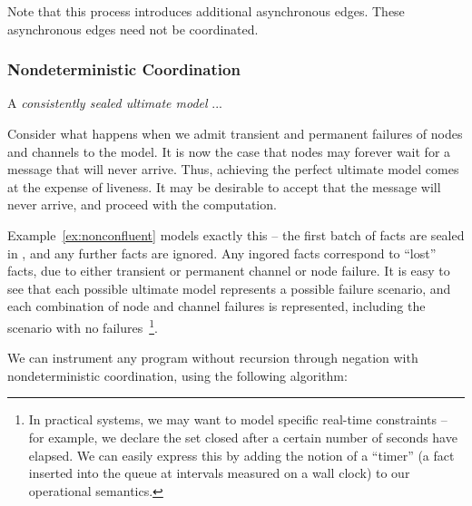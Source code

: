 Note that this process introduces additional asynchronous edges.  These asynchronous edges need not be coordinated. 


\subsubsection{Nondeterministic Coordination}

\begin{definition}
A {\em consistently sealed ultimate model} ...
\end{definition}


Consider what happens when we admit transient and permanent failures of nodes and channels to the model.  It is now the case that nodes may forever wait for a message that will never arrive.  Thus, achieving the perfect ultimate model comes at the expense of liveness.  It may be desirable to accept that the message will never arrive, and proceed with the computation.

Example~\ref{ex:nonconfluent} models exactly this -- the first batch of  facts are sealed in , and any further  facts are ignored.  Any ingored  facts correspond to ``lost''  facts, due to either transient or permanent channel or node failure.  It is easy to see that each possible ultimate model represents a possible failure scenario, and each combination of node and channel failures is represented, including the scenario with no failures~\footnote{In practical systems, we may want to model specific real-time constraints -- for example, we declare the set closed after a certain number of seconds have elapsed.  We can easily express this by adding the notion of a ``timer'' (a fact inserted into the queue at intervals measured on a wall clock) to our operational semantics.}.

We can instrument any \lang program without recursion through negation with nondeterministic coordination, using the following algorithm:

